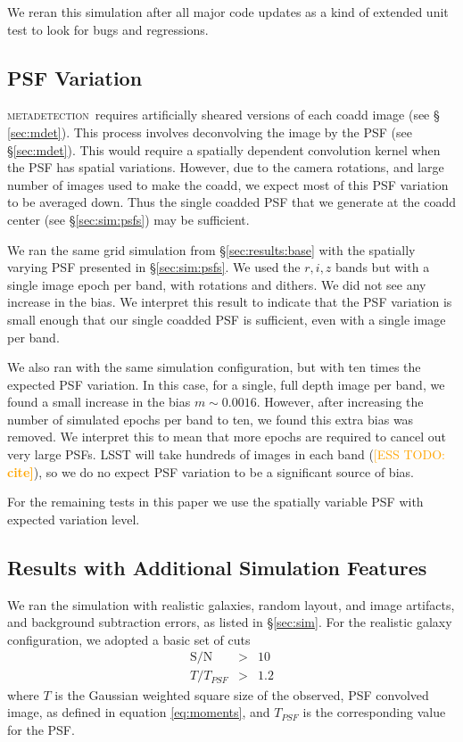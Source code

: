 \documentclass[iop, twocolappendix, appendixfloats, numberedappendix, apj]{hackemulateapj}
\newcommand{\esstodo}[1]{\textcolor{orange}{[ESS TODO: \bf #1]}}
\newcommand{\mdet}{\textsc{metadetection}}
\begin{document}
We reran this simulation after all major code updates as a kind of extended
unit test to look for bugs and regressions.

\subsection{PSF Variation} \label{sec:results:psfvar}

\mdet\ requires artificially sheared versions of each coadd image (see \S
\ref{sec:mdet}).  This process involves deconvolving the image by the PSF (see
\S \ref{sec:mdet}).  This would require a spatially dependent convolution
kernel when the PSF has spatial variations.  However, due to the camera
rotations, and large number of images used to make the coadd, we expect most of
this PSF variation to be averaged down.  Thus the single coadded PSF that we
generate at the coadd center (see \S \ref{sec:sim:psfs}) may be sufficient.

We ran the same grid simulation from \S \ref{sec:results:base} with the
spatially varying PSF presented in \S \ref{sec:sim:psfs}. We used the $r, i, z$
bands but with a single image epoch per band, with rotations and dithers. We
did not see any increase in the bias.   We interpret this result to indicate
that the PSF variation is small enough that our single coadded PSF is
sufficient, even with a single image per band.

We also ran with the same simulation configuration, but with ten times the
expected PSF variation. In this case, for a single, full depth image per band,
we found a small increase in the bias $m \sim 0.0016$.  However, after
increasing the number of simulated epochs per band to ten, we found this extra
bias was removed.  We interpret this to mean that more epochs are required to
cancel out very large PSFs.  LSST will take hundreds of images in each band
(\esstodo{cite}), so we do no expect PSF variation to be a significant source
of bias.

For the remaining tests in this paper we use the spatially variable PSF with
expected variation level.

\subsection{Results with Additional Simulation Features} \label{sec:results:more}

We ran the simulation with realistic galaxies, random layout, and image
artifacts, and background subtraction errors, as listed in \S \ref{sec:sim}.
For the realistic galaxy configuration, we adopted a basic set of cuts
\begin{eqnarray}
    \mathrm{S/N} & > & 10 \\
    T/T_{PSF} & > & 1.2
\end{eqnarray}
where $T$ is the Gaussian weighted square size of the observed, PSF convolved
image, as defined in equation \ref{eq:moments}, and $T_{PSF}$ is the
corresponding value for the PSF.
\end{document}
